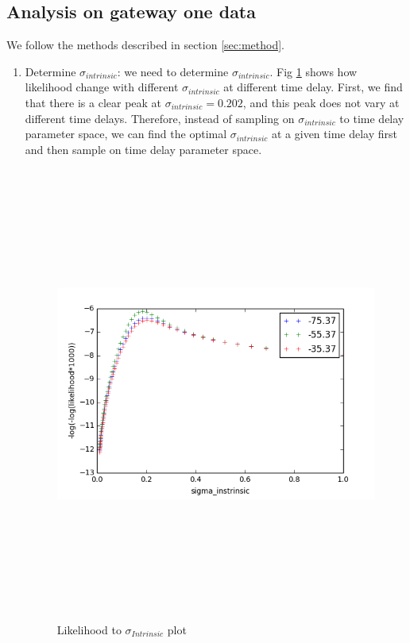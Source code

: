 \documentclass[\docopts]{\docclass}
\begin{document}
\subsection{Analysis on gateway one data}
We follow the methods described in section \ref{sec:method}.
\begin{enumerate}
\item Determine $\sigma_{intrinsic}$: we need to determine $\sigma_{intrinsic}$. Fig \ref{fig:sigma1} shows how likelihood change with different $\sigma_{intrinsic}$ at different time delay. First, we find that there is a clear peak at $\sigma_{intrinsic}=0.202$, and this peak does not vary at different time delays.
Therefore, instead of sampling on $\sigma_{intrinsic}$ to time delay parameter space, we can find the optimal $\sigma_{intrinsic}$ at a given time delay first and then sample on time delay parameter space.
\begin{figure}[!h]
\includegraphics[width=\textwidth, height=15cm, keepaspectratio]{sigma_0.png}
\caption{Likelihood to $\sigma_{Intrinsic}$ plot}
\label{fig:sigma1}
\end{figure}


\end{enumerate}
\end{document}
